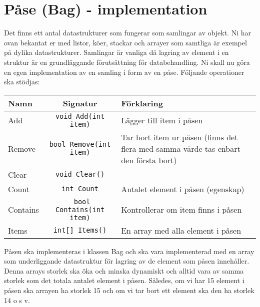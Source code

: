 \documentclass{article}
\begin{document}
  \section*{Påse (Bag) - implementation}
  Det finns ett antal datastrukturer som fungerar som samlingar av objekt. Ni har ovan bekantat
  er med listor, köer, stackar och arrayer som samtliga är exempel på dylika datastrukturer.
  Samlingar är vanliga då lagring av element i en struktur är en grundläggande förutsättning
  för databehandling. Ni skall nu göra en egen implementation av en samling i form av en
  påse. Följande operationer ska stödjas:
  
  \begin{center}
  \renewcommand{\arraystretch}{1.5}
    \begin{tabular}{ l | c | p{5cm}}
    
      
      \textbf{Namn} & \textbf{Signatur} & \textbf{Förklaring} \\ \hline
      Add & \texttt{void Add(int item)}& Lägger till item i påsen \\ 
      Remove & \texttt{bool Remove(int item)} & Tar bort item ur påsen (finns det flera med samma värde tas enbart den första bort) \\
      Clear & \texttt{void Clear()} \\ 
      Count & \texttt{int Count} & Antalet element i påsen (egenskap) \\
      Contains &\texttt{ bool Contains(int item)} & Kontrollerar om item finns i påsen  \\ 
      Items & \texttt{int[] Items()} & En array med alla element i påsen \\
      \hline
    \end{tabular}
  \end{center}
  
  Påsen ska implementeras i klassen Bag och ska vara implementerad med en array som
  underliggande datastruktur för lagring av de element som påsen innehåller. Denna arrays
  storlek ska öka och minska dynamiskt och alltid vara av samma storlek som det totala antalet
  element i påsen. Således, om vi har 15 element i påsen ska arrayen ha storlek 15 och om vi
  tar bort ett element ska den ha storlek 14 o s v.
\end{document}
